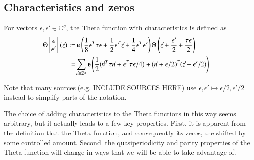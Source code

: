 \subsection{Characteristics and zeros}
\begin{definition}
    For vectors $\epsilon,\epsilon' \in \mathbb C^g$, the Theta function with characteristics is defined as
    \begin{align}
        \Theta\begin{bmatrix} \epsilon \\  \epsilon'\end{bmatrix}(\vec z) :=& \ 
        \bolde\left(\frac{1}{8}\epsilon^T \tau \epsilon + \frac{1}{2}\epsilon^T \vec z + \frac{1}{4}\epsilon^T  \epsilon'\right)
        \Theta\left(\vec z + \frac{\epsilon'}{2}+\frac{\tau\epsilon}{2}\right)
       \\ =& \sum_{\vec n \in \mathbb Z^g} \bolde\left(\frac{1}{2} (\vec n^T \tau \vec n +\epsilon^T \tau \epsilon/4) + (\vec n+\epsilon/2)^T (\vec z+\epsilon'/2)\right).
    \end{align}

    Note that many sources (e.g. INCLUDE SOURCES HERE) use $\epsilon,\epsilon' \mapsto \epsilon/2,\epsilon'/2$ instead to simplify parts of the notation.
\end{definition}

The choice of adding characteristics to the Theta functions in this way seems arbitrary, but it actually leads to a few key properties. First, it is apparent from the definition that the Theta function, and consequently its zeros, are shifted by some controlled amount. Second, the quasiperiodicity and parity properties of the Theta function will change in ways that we will be able to take advantage of.

